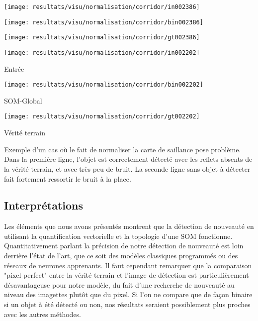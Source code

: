 	\begin{figureth}
		\begin{subfigureth}{.32\textwidth}
			\texttt{[image: resultats/visu/normalisation/corridor/in002386]}
		\end{subfigureth}
		\begin{subfigureth}{.32\textwidth}
			\texttt{[image: resultats/visu/normalisation/corridor/bin002386]}
		\end{subfigureth}
		\begin{subfigureth}{.32\textwidth}
			\texttt{[image: resultats/visu/normalisation/corridor/gt002386]}
		\end{subfigureth}

		\begin{subfigureth}{.32\textwidth}
			\texttt{[image: resultats/visu/normalisation/corridor/in002202]} \caption{Entrée}
		\end{subfigureth}
		\begin{subfigureth}{.32\textwidth}
			\texttt{[image: resultats/visu/normalisation/corridor/bin002202]} \caption{SOM-Global}
		\end{subfigureth}
		\begin{subfigureth}{.32\textwidth}
			\texttt{[image: resultats/visu/normalisation/corridor/gt002202]} \caption{Vérité terrain}
		\end{subfigureth}

		\caption[Visualisation des effets de la normalisation]{Exemple d'un cas où le fait de normaliser la carte de saillance pose problème. Dans la première ligne, l'objet est correctement détecté avec les reflets absents de la vérité terrain, et avec très peu de bruit. La seconde ligne sans objet à détecter fait fortement ressortir le bruit à la place.}\label{fig:res:visu-normalisation}
	\end{figureth}

	\subsection{Interprétations}

	Les éléments que nous avons présentés montrent que la détection de nouveauté en utilisant la quantification vectorielle et la topologie d'une SOM fonctionne. Quantitativement parlant la précision de notre détection de nouveauté est loin derrière l'état de l'art, que ce soit des modèles classiques programmés ou des réseaux de neurones apprenants. Il faut cependant remarquer que la comparaison "pixel perfect" entre la vérité terrain et l'image de détection est particulièrement désavantageuse pour notre modèle, du fait d'une recherche de nouveauté au niveau des imagettes plutôt que du pixel. Si l'on ne compare que de façon binaire si un objet à été détecté ou non, nos résultats seraient possiblement plus proches avec les autres méthodes.
	
